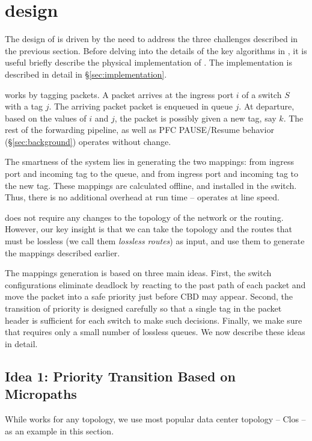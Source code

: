\section{\sysname{} design}
\label{sec:generic}

The design of \sysname{} is driven by the need to address the three challenges
described in the previous section. Before delving into the details of the key
algorithms in \sysname{}, it is useful briefly describe the physical
implementation of \sysname{}. The implementation is described in detail in
\S\ref{sec:implementation}.

\sysname{} works by tagging packets.  A packet arrives at the ingress port $i$
of a switch $S$ with a tag $j$. The arriving packet packet is enqueued in queue
$j$.  At departure, based on the values of $i$ and $j$, the packet is possibly
given a new tag, say $k$. The rest of the forwarding pipeline, as well as PFC
PAUSE/Resume behavior (\S\ref{sec:background}) operates without change. 

The smartness of the system lies in generating the two mappings: from ingress
port and incoming tag to the queue, and from ingress port and incoming tag to
the new tag. These mappings are calculated offline, and installed in the switch.
Thus, there is no additional overhead at run time -- \sysname{} operates at line
speed.

\sysname{} does not require any changes to the topology of the network or the
routing. However, our  key insight is that we can take the topology and the
routes that must be lossless (we call them {\em lossless routes}) as input, and
use them to generate the mappings described earlier. 

The mappings generation is based on three main ideas.  First, the switch
configurations eliminate deadlock by reacting to the past path of each packet
and move the packet into a safe priority just before CBD may appear.  Second,
the transition of priority is designed carefully so that  a single tag in the
packet header is sufficient for each switch to make such decisions. Finally, we
make sure that \sysname{} requires only a small number of lossless queues. We
now describe these ideas in detail.

\subsection{Idea 1: Priority Transition Based on Micropaths} 

While \sysname{} works for any topology, we use most popular data center
topology -- Clos -- as an example in this section.

